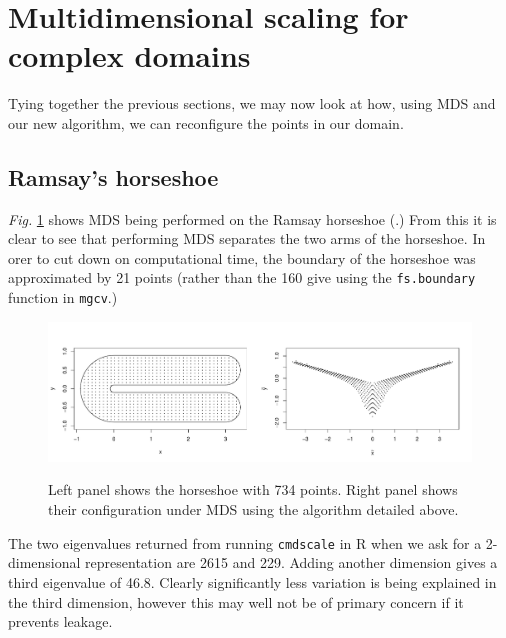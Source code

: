 \documentclass[a4paper,10pt]{article}
\newcommand{\fig}[1]{\emph{fig.} \ref{#1}}
\newcommand{\Fig}[1]{\emph{Fig.} \ref{#1}}
\begin{document}
\section{Multidimensional scaling for complex domains}

Tying together the previous sections, we may now look at how, using MDS and our new algorithm, we can reconfigure the points in our domain.

\subsection{Ramsay's horseshoe}

\Fig{ramsay-mds} shows MDS being performed on the Ramsay horseshoe (\cite{ramsay}.) From this it is clear to see that performing MDS separates the two arms of the horseshoe. In orer to cut down on computational time, the boundary of the horseshoe was approximated by 21 points (rather than the 160 give using the \texttt{fs.boundary} function in \texttt{mgcv}.)

\begin{figure}
\centering
\includegraphics[trim=0in 0.5in 0in 0.25in, width=5.5in]{figs/ramsay-mds.pdf} \\
\caption{Left panel shows the horseshoe with 734 points. Right panel shows their configuration under MDS using the algorithm detailed above.}
\label{ramsay-mds}
\end{figure}


The two eigenvalues returned from running \texttt{cmdscale} in \textsf{R} when we ask for a 2-dimensional representation are 2615 and 229. Adding another dimension gives a third eigenvalue of 46.8. Clearly significantly less variation is being explained in the third dimension, however this may well not be of primary concern if it prevents leakage.
\end{document}
